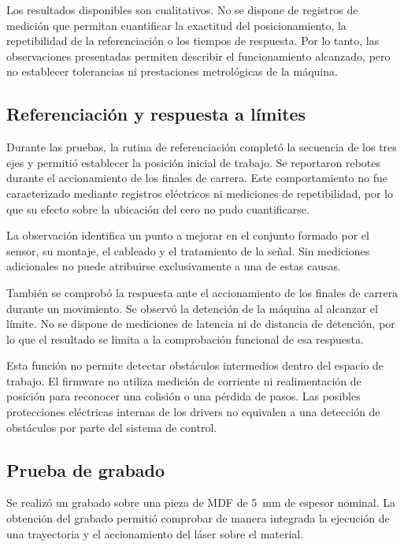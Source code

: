 \documentclass[blue,fullpaper]{ludusofficial}  %
\begin{document}
Los resultados disponibles son cualitativos.
No se dispone de registros de medición que permitan
cuantificar la exactitud del posicionamiento,
la repetibilidad de la referenciación o los tiempos
de respuesta. Por lo tanto, las observaciones
presentadas permiten describir el funcionamiento
alcanzado, pero no establecer tolerancias
ni prestaciones metrológicas de la máquina.

\subsection{Referenciación y respuesta a límites}

Durante las pruebas, la rutina de referenciación
completó la secuencia de los tres ejes y permitió
establecer la posición inicial de trabajo.
Se reportaron rebotes durante el accionamiento
de los finales de carrera. Este comportamiento
no fue caracterizado mediante registros eléctricos
ni mediciones de repetibilidad, por lo que su efecto
sobre la ubicación del cero no pudo cuantificarse.

La observación identifica un punto a mejorar
en el conjunto formado por el sensor, su montaje,
el cableado y el tratamiento de la señal.
Sin mediciones adicionales no puede atribuirse
exclusivamente a una de estas causas.

También se comprobó la respuesta ante el accionamiento
de los finales de carrera durante un movimiento.
Se observó la detención de la máquina al alcanzar
el límite. No se dispone de mediciones de latencia
ni de distancia de detención, por lo que el resultado
se limita a la comprobación funcional de esa respuesta.

Esta función no permite detectar obstáculos
intermedios dentro del espacio de trabajo.
El firmware no utiliza medición de corriente
ni realimentación de posición para reconocer
una colisión o una pérdida de pasos.
Las posibles protecciones eléctricas internas
de los drivers no equivalen a una detección
de obstáculos por parte del sistema de control.

\subsection{Prueba de grabado}

Se realizó un grabado sobre una pieza de MDF
de 5~mm de espesor nominal. La obtención del grabado
permitió comprobar de manera integrada la ejecución
de una trayectoria y el accionamiento del láser
sobre el material.
\end{document}
